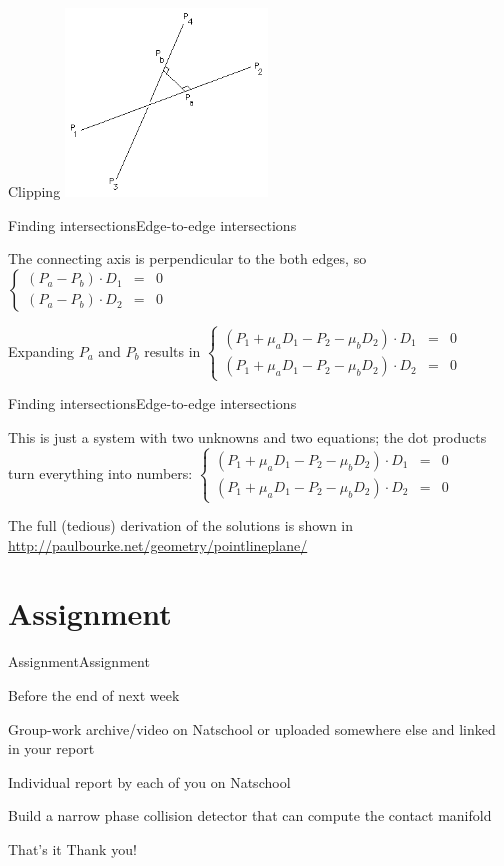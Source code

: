 \documentclass{beamer}
\begin{document}
\begin{frame}{Clipping}
\center
\includegraphics[height=5cm]{Pics/EdgeEdgeIntersection.png}
\end{frame}

\begin{slide}{Finding intersections}{Edge-to-edge intersections}{
\item The connecting axis is perpendicular to the both edges, so
$\left\{ \begin{matrix}
(P_a - P_b) \cdot D_1 &=& 0 \\
(P_a - P_b) \cdot D_2 &=& 0
\end{matrix} \right.$
\pause 
\item Expanding $P_a$ and $P_b$ results in
$\left\{ \begin{matrix}
(P_1 + \mu_a D_1 - P_2 - \mu_b D_2) \cdot D_1 &=& 0 \\
(P_1 + \mu_a D_1 - P_2 - \mu_b D_2) \cdot D_2 &=& 0
\end{matrix} \right.$
}\end{slide}

\begin{slide}{Finding intersections}{Edge-to-edge intersections}{
\item This is just a system with two unknowns and two equations; the dot products turn everything into numbers:
$\left\{ \begin{matrix}
(P_1 + \mu_a D_1 - P_2 - \mu_b D_2) \cdot D_1 &=& 0 \\
(P_1 + \mu_a D_1 - P_2 - \mu_b D_2) \cdot D_2 &=& 0
\end{matrix} \right.$
\item The full (tedious) derivation of the solutions is shown in \url{http://paulbourke.net/geometry/pointlineplane/}
}\end{slide}

\section{Assignment}
\begin{slide}{Assignment}{Assignment}{
\item Before the end of next week
\item Group-work archive/video on Natschool or uploaded somewhere else and linked in your report
\item Individual report by each of you on Natschool
\item Build a narrow phase collision detector that can compute the contact manifold
}\end{slide}

\begin{frame}{That's it}
\center
\fontsize{18pt}{7.2}\selectfont
Thank you!
\end{frame}
\end{document}
